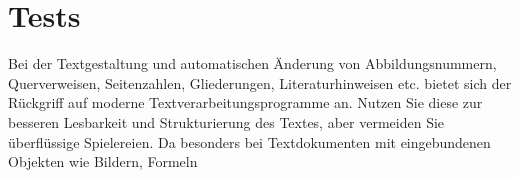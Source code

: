 \section{Tests}
Bei der Textgestaltung und automatischen Änderung von Abbildungsnummern, Querverweisen,
Seitenzahlen, Gliederungen, Literaturhinweisen etc. bietet sich der Rückgriff
auf moderne Textverarbeitungsprogramme an. Nutzen Sie diese zur besseren Lesbarkeit
und Strukturierung des Textes, aber vermeiden Sie überflüssige Spielereien. Da
besonders bei Textdokumenten mit eingebundenen Objekten wie Bildern, Formeln
